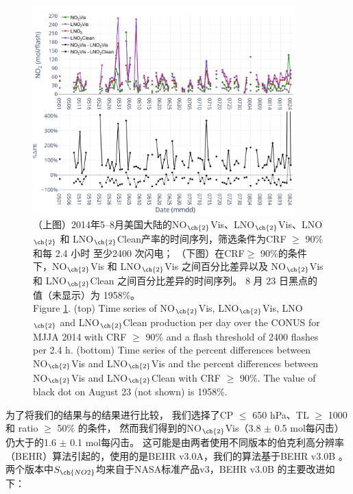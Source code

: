 \begin{figure}[H]
\centering
\includegraphics[width=0.9\textwidth]{./figures/us_pe_timeseries.png}
\caption{（上图）2014年5--8月美国大陆的NO$_{\ch{2}}$Vis、LNO$_{\ch{2}}$Vis、LNO$_{\ch{2}}$ 和 LNO$_{\ch{2}}$Clean产率的时间序列，筛选条件为CRF $\geq$ 90\% 和每 2.4 小时 至少2400 次闪电；
（下图）在CRF$\geq$ 90\%的条件下，NO$_{\ch{2}}$Vis 和 LNO$_{\ch{2}}$Vis 之间百分比差异以及 NO$_{\ch{2}}$Vis 和 LNO$_{\ch{2}}$Clean 之间百分比差异的时间序列。
8 月 23 日黑点的值（未显示）为 1958\%。\\
Figure \ref{fig:us_pe_timeseries}. (top) Time series of NO$_{\ch{2}}$Vis, LNO$_{\ch{2}}$Vis, LNO$_{\ch{2}}$ and LNO$_{\ch{2}}$Clean production per day over the CONUS for MJJA 2014 with CRF $\geq$ 90\% and a flash threshold of 2400 flashes per 2.4 h.
(bottom) Time series of the percent differences between NO$_{\ch{2}}$Vis and LNO$_{\ch{2}}$Vis and the percent differences between NO$_{\ch{2}}$Vis and LNO$_{\ch{2}}$Clean with CRF $\geq$ 90\%.
The value of black dot on August 23 (not shown) is 1958\%.}
\label{fig:us_pe_timeseries}
\end{figure}


为了将我们的结果与\citet{Lapierre.2020}的结果进行比较，
我们选择了CP $\leq$ 650 hPa、TL $\geq$ 1000 和 ratio $\geq$ 50\% 的条件，
然而我们得到的NO$_{\ch{2}}$Vis（3.8 $\pm$ 0.5 mol每闪击）仍大于\citet{Lapierre.2020}的1.6 $\pm$ 0.1 mol每闪击。
这可能是由两者使用不同版本的伯克利高分辨率（BEHR）算法引起的，\citet{Lapierre.2020}使用的是BEHR v3.0A，我们的算法基于BEHR v3.0B \citep{Laughner.2019a}。
两个版本中$S_{\ch{NO2}}$均来自于NASA标准产品v3，BEHR v3.0B 的主要改进如下：

